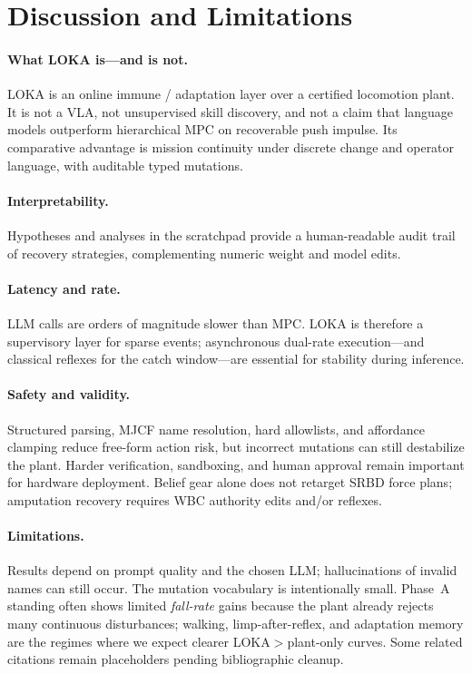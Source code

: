 \section{Discussion and Limitations}
\label{sec:discussion}

\paragraph{What LOKA is---and is not.}
LOKA is an online immune / adaptation layer over a certified locomotion plant.
It is not a VLA, not unsupervised skill discovery, and not a claim that language models outperform hierarchical MPC on recoverable push impulse.
Its comparative advantage is mission continuity under discrete change and operator language, with auditable typed mutations.

\paragraph{Interpretability.}
Hypotheses and analyses in the scratchpad provide a human-readable audit trail of recovery strategies, complementing numeric weight and model edits.

\paragraph{Latency and rate.}
LLM calls are orders of magnitude slower than MPC.
LOKA is therefore a supervisory layer for sparse events; asynchronous dual-rate execution---and classical reflexes for the catch window---are essential for stability during inference.

\paragraph{Safety and validity.}
Structured parsing, MJCF name resolution, hard allowlists, and affordance clamping reduce free-form action risk, but incorrect mutations can still destabilize the plant.
Harder verification, sandboxing, and human approval remain important for hardware deployment.
Belief gear alone does not retarget SRBD force plans; amputation recovery requires WBC authority edits and/or reflexes.

\paragraph{Limitations.}
Results depend on prompt quality and the chosen LLM; hallucinations of invalid names can still occur.
The mutation vocabulary is intentionally small.
Phase~A standing often shows limited \emph{fall-rate} gains because the plant already rejects many continuous disturbances; walking, limp-after-reflex, and adaptation memory are the regimes where we expect clearer LOKA$>$plant-only curves.
Some related citations remain placeholders pending bibliographic cleanup.

